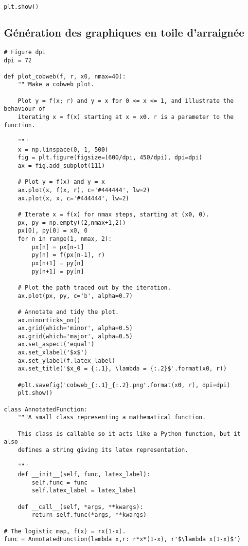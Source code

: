 \begin{appendices}
\begin{verbatim}
plt.show()
    \end{verbatim}
    \newpage
    \subsection{Génération des graphiques en toile d'arraignée}
    \begin{verbatim}
# Figure dpi
dpi = 72

def plot_cobweb(f, r, x0, nmax=40):
    """Make a cobweb plot.

    Plot y = f(x; r) and y = x for 0 <= x <= 1, and illustrate the behaviour of
    iterating x = f(x) starting at x = x0. r is a parameter to the function.

    """
    x = np.linspace(0, 1, 500)
    fig = plt.figure(figsize=(600/dpi, 450/dpi), dpi=dpi)
    ax = fig.add_subplot(111)

    # Plot y = f(x) and y = x
    ax.plot(x, f(x, r), c='#444444', lw=2)
    ax.plot(x, x, c='#444444', lw=2)

    # Iterate x = f(x) for nmax steps, starting at (x0, 0).
    px, py = np.empty((2,nmax+1,2))
    px[0], py[0] = x0, 0
    for n in range(1, nmax, 2):
        px[n] = px[n-1]
        py[n] = f(px[n-1], r)
        px[n+1] = py[n]
        py[n+1] = py[n]

    # Plot the path traced out by the iteration.
    ax.plot(px, py, c='b', alpha=0.7)

    # Annotate and tidy the plot.
    ax.minorticks_on()
    ax.grid(which='minor', alpha=0.5)
    ax.grid(which='major', alpha=0.5)
    ax.set_aspect('equal')
    ax.set_xlabel('$x$')
    ax.set_ylabel(f.latex_label)
    ax.set_title('$x_0 = {:.1}, \lambda = {:.2}$'.format(x0, r))

    #plt.savefig('cobweb_{:.1}_{:.2}.png'.format(x0, r), dpi=dpi)
    plt.show()

class AnnotatedFunction:
    """A small class representing a mathematical function.

    This class is callable so it acts like a Python function, but it also
    defines a string giving its latex representation.

    """
    def __init__(self, func, latex_label):
        self.func = func
        self.latex_label = latex_label

    def __call__(self, *args, **kwargs):
        return self.func(*args, **kwargs)

# The logistic map, f(x) = rx(1-x).
func = AnnotatedFunction(lambda x,r: r*x*(1-x), r'$\lambda x(1-x)$')


\end{verbatim}
\end{appendices}
